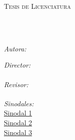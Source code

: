 \documentclass[
12pt, %
spanish, %
singlespacing, %
headsepline, %
]{MastersDoctoralThesis} %
\author{Adriana Felisa Chávez De la Peña}%
\begin{document}
\frontmatter %

\pagestyle{plain} %


\begin{titlepage}
\begin{center}

\vspace*{.06\textheight}
{\scshape\LARGE \univname\par}\vspace{1.3cm} %
\textsc{\Large Tesis de Licenciatura}\\[0.5cm] %

\HRule \\[0.4cm] %
{\huge \bfseries \ttitle\par}\vspace{0.4cm} %
\HRule \\[1.0cm] %

\begin{minipage}[t]{0.4\textwidth}
\begin{center} \large
\emph{Autora:}\\
\href{adrifelcha@gmail.com}{\authorname} %
\end{center}
 
\begin{center} \large
\emph{Director:}\\
\href{abouzasr@gmail.com}{\supname}\\ %
\emph{Revisor:} \\
\href{germanpalafox@gmail.com}{\examname}\\ %
\emph{Sinodales:} \\
\href{germanpalafox@gmail.com}{Sinodal 1}\\ %
\href{germanpalafox@gmail.com}{Sinodal 2}\\ %
\href{germanpalafox@gmail.com}{Sinodal 3}\\ %
\end{center}
\end{minipage}\\[1.3cm]


\end{center}
\end{titlepage}
\end{document}
